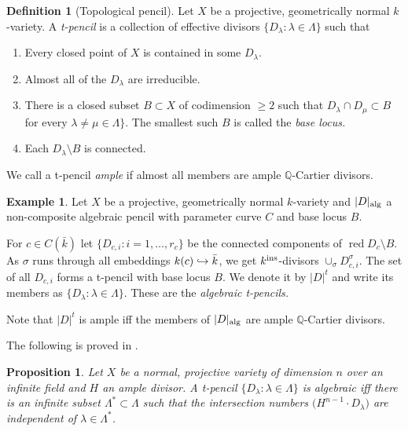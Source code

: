 \documentclass{amsart}
\newtheorem{prop}[thm]{Proposition}
\theoremstyle{definition}
\newtheorem{defn}[thm]{Definition}
\newtheorem{exmp}[thm]{Example}
\theoremstyle{remark}
\newcommand{\q}[0]{{\mathbb Q}}
\newcommand{\red}[0]{\operatorname{red}}
\def\into{\DOTSB\lhook\joinrel\to}
\begin{document}
\begin{defn}[Topological pencil]\label{t.pencil.defn}
Let  $X$ be  a  projective, geometrically normal  $k$-variety.
 A {\it t-pencil} is a collection of effective divisors
$\{D_{\lambda}:\lambda\in\Lambda\}$ such that
\begin{enumerate}
\item Every closed point of $X$ is contained in some $D_{\lambda}$.
\item Almost all of the $D_{\lambda}$ are irreducible.
\item  There is a closed subset $B\subset X$ of codimension $\geq 2$ such that
$D_{\lambda}\cap D_{\mu}\subset B$ for every $\lambda\neq  \mu \in \Lambda\}$.
The smallest such $B$ is called the {\it base locus.} 
\item Each $D_{\lambda}\setminus B$ is connected.
\end{enumerate}
We call a t-pencil  {\it ample} if almost all members are ample $\q$-Cartier divisors.
\end{defn}

\begin{exmp} \label{t.penc.true.meb.defn}
Let $X$ be  a  projective, geometrically normal $k$-variety
and  $|D|_{\rm alg}$ a  non-composite algebraic pencil with parameter curve $C$
and base locus $B$. 

For $c\in C(\bar k)$  let $\{D_{c,i}:i=1,\dots, r_c\}$ be the connected components of $\red D_c\setminus B$.   As $\sigma$ runs through all embeddings
$k(c)\into \bar k$, we get $k^{\rm ins}$-divisors
$\cup_{\sigma}  D_{c,i}^\sigma$.
The set of all $D_{c,i}$ forms a t-pencil with base locus $B$.
We denote it by  $|D|^t$ and write its members as 
$\{D_{\lambda}:\lambda\in\Lambda\}$.
These are the   {\it algebraic  t-pencils.} 

Note that $|D|^t$ is ample iff the members of  $|D|_{\rm alg}$ are ample $\q$-Cartier divisors.
\end{exmp}



The following is proved in  \cite[5.2.8]{k-lo-2}.

\begin{prop} \label{t.penc.alg.deg.char}
Let $X$ be a normal, projective variety of dimension $n$ over an infinite field and $H$ an ample divisor. A  t-pencil $\{D_{\lambda}:\lambda\in\Lambda\}$  is algebraic iff 
there is an infinite subset $\Lambda^*\subset \Lambda$ such that  the intersection numbers $\bigl(H^{n-1}\cdot D_{\lambda}\bigr)$ are independent of  $\lambda\in\Lambda^*$.
\end{prop}
\end{document}
